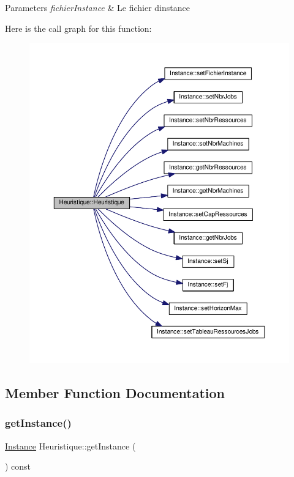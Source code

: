 \begin{DoxyParams}{Parameters}
{\em fichier\+Instance} & Le fichier d\textquotesingle{}instance \\
\hline
\end{DoxyParams}
Here is the call graph for this function\+:\nopagebreak
\begin{figure}[H]
\begin{center}
\leavevmode
\includegraphics[width=350pt]{classHeuristique_a58630433c6bac8eec9a5888945eba479_cgraph}
\end{center}
\end{figure}


\subsection{Member Function Documentation}
\mbox{\label{classHeuristique_aa6eca6703702298968f03ac30c4be86f}} 
\subsubsection{\texorpdfstring{get\+Instance()}{getInstance()}}
{\footnotesize\ttfamily \hyperlink{classInstance}{Instance} Heuristique\+::get\+Instance (\begin{DoxyParamCaption}{ }\end{DoxyParamCaption}) const}



